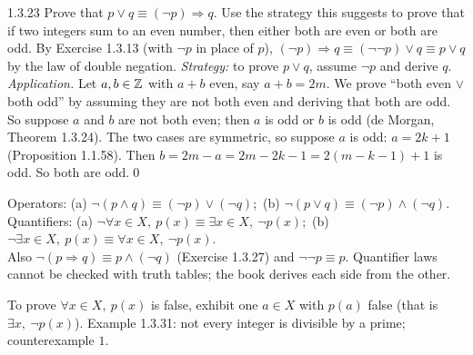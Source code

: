 \begin{bookex}{1.3.23}
Prove that $p\vee q\equiv(\neg p)\Rightarrow q$. Use the strategy this suggests to prove that if two integers sum to an even number, then either both are even or both are odd.
\solution
By Exercise 1.3.13 (with $\neg p$ in place of $p$), $(\neg p)\Rightarrow q\equiv(\neg\neg p)\vee q\equiv p\vee q$ by the law of double negation. \emph{Strategy:} to prove $p\vee q$, assume $\neg p$ and derive $q$.\\
\emph{Application.} Let $a,b\in\mathbb{Z}$ with $a+b$ even, say $a+b=2m$. We prove ``both even $\vee$ both odd'' by assuming they are not both even and deriving that both are odd. So suppose $a$ and $b$ are not both even; then $a$ is odd or $b$ is odd (de Morgan, Theorem 1.3.24). The two cases are symmetric, so suppose $a$ is odd: $a=2k+1$ (Proposition 1.1.58). Then $b=2m-a=2m-2k-1=2(m-k-1)+1$ is odd. So both are odd.\qed
\end{bookex}

\begin{result}
Operators: (a) $\neg(p\wedge q)\equiv(\neg p)\vee(\neg q)$;\ (b) $\neg(p\vee q)\equiv(\neg p)\wedge(\neg q)$.\\
Quantifiers: (a) $\neg\forall x\in X,\ p(x)\equiv\exists x\in X,\ \neg p(x)$;\ (b) $\neg\exists x\in X,\ p(x)\equiv\forall x\in X,\ \neg p(x)$.\\
Also $\neg(p\Rightarrow q)\equiv p\wedge(\neg q)$ (Exercise 1.3.27) and $\neg\neg p\equiv p$. Quantifier laws cannot be checked with truth tables; the book derives each side from the other.
\end{result}
\begin{strategy}
To prove $\forall x\in X,\ p(x)$ is false, exhibit one $a\in X$ with $p(a)$ false (that is $\exists x,\ \neg p(x)$). Example 1.3.31: not every integer is divisible by a prime; counterexample $1$.
\end{strategy}

